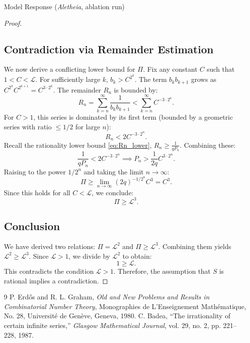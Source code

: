 \documentclass[11pt]{article}
\begin{document}
\begin{solution}{Model Response (\emph{Aletheia}, ablation run)}
\begin{proof}
\subsection*{Contradiction via Remainder Estimation}

We now derive a conflicting lower bound for $\Pi$. Fix any constant $C$ such that $1 < C < \mathcal{L}$. For sufficiently large $k$, $b_k > C^{2^k}$. The term $b_k b_{k+1}$ grows as $C^{2^k} C^{2^{k+1}} = C^{3 \cdot 2^k}$. The remainder $R_n$ is bounded by:
\[ R_n = \sum_{k=n}^\infty \frac{1}{b_k b_{k+1}} < \sum_{k=n}^\infty C^{-3 \cdot 2^k}. \]
For $C > 1$, this series is dominated by its first term (bounded by a geometric series with ratio $\le 1/2$ for large $n$):
\[ R_n < 2 C^{-3 \cdot 2^n}. \]
Recall the rationality lower bound \eqref{eq:Rn_lower}, $R_n \ge \frac{1}{q P_n}$. Combining these:
\[ \frac{1}{q P_n} < 2 C^{-3 \cdot 2^n} \implies P_n > \frac{1}{2q} C^{3 \cdot 2^n}. \]
Raising to the power $1/2^n$ and taking the limit $n \to \infty$:
\[ \Pi \ge \lim_{n\to\infty} (2q)^{-1/2^n} C^3 = C^3. \]
Since this holds for all $C < \mathcal{L}$, we conclude:
\begin{equation} \label{eq:Pi_L3}
\Pi \ge \mathcal{L}^3.
\end{equation}

\subsection*{Conclusion}

We have derived two relations: $\Pi = \mathcal{L}^2$ and $\Pi \ge \mathcal{L}^3$. Combining them yields $\mathcal{L}^2 \ge \mathcal{L}^3$. Since $\mathcal{L} > 1$, we divide by $\mathcal{L}^2$ to obtain:
\[ 1 \ge \mathcal{L}. \]
This contradicts the condition $\mathcal{L} > 1$. Therefore, the assumption that $S$ is rational implies a contradiction.
\end{proof}

\begin{thebibliography}{9}
 P. Erd\H{o}s and R. L. Graham, \textit{Old and New Problems and Results in Combinatorial Number Theory}, Monographies de L'Enseignement Math\'ematique, No. 28, Universit\'e de Gen\`eve, Geneva, 1980.
 C. Badea, ``The irrationality of certain infinite series,'' \textit{Glasgow Mathematical Journal}, vol. 29, no. 2, pp. 221--228, 1987.
\end{thebibliography}
\end{solution}
\end{document}

